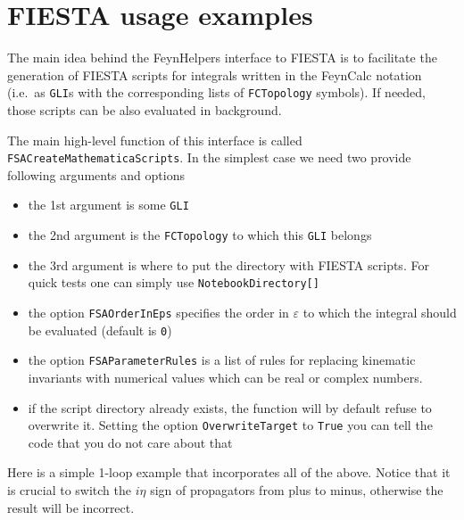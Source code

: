 \documentclass[../FeynHelpersManual.tex]{subfiles}
\begin{document}
\hypertarget{fiesta usage examples}{
\section{FIESTA usage examples}\label{fiesta usage examples}}

The main idea behind the FeynHelpers interface to FIESTA is to
facilitate the generation of FIESTA scripts for integrals written in the
FeynCalc notation (i.e.~as \texttt{GLI}s with the corresponding lists of
\texttt{FCTopology} symbols). If needed, those scripts can be also
evaluated in background.

The main high-level function of this interface is called
\texttt{FSACreateMathematicaScripts}. In the simplest case we need two
provide following arguments and options

\begin{itemize}
\tightlist
\item
  the 1st argument is some \texttt{GLI}
\item
  the 2nd argument is the \texttt{FCTopology} to which this \texttt{GLI}
  belongs
\item
  the 3rd argument is where to put the directory with FIESTA scripts.
  For quick tests one can simply use
  \texttt{NotebookDirectory[\allowbreak{}]}
\item
  the option \texttt{FSAOrderInEps} specifies the order in
  \(\varepsilon\) to which the integral should be evaluated (default is
  \texttt{0})
\item
  the option \texttt{FSAParameterRules} is a list of rules for replacing
  kinematic invariants with numerical values which can be real or
  complex numbers.
\item
  if the script directory already exists, the function will by default
  refuse to overwrite it. Setting the option \texttt{OverwriteTarget} to
  \texttt{True} you can tell the code that you do not care about that
\end{itemize}

Here is a simple 1-loop example that incorporates all of the above.
Notice that it is crucial to switch the \(i \eta\) sign of propagators
from plus to minus, otherwise the result will be incorrect.
\end{document}

